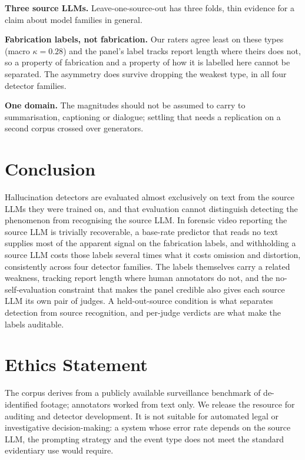 \documentclass{article}
\begin{document}
\textbf{Three source LLMs.} Leave-one-source-out has three folds, thin
evidence for a claim about model families in general.

\textbf{Fabrication labels, not fabrication.} Our raters agree least on these
types (macro $\kappa = 0.28$) and the panel's label tracks report length where
theirs does not, so a property of fabrication and a property of how it is
labelled here cannot be separated. The asymmetry does survive dropping the
weakest type, in all four detector families.

\textbf{One domain.} The magnitudes should not be assumed to carry to
summarisation, captioning or dialogue; settling that needs a replication on a
second corpus crossed over generators.

\section{Conclusion}

Hallucination detectors are evaluated almost exclusively on text from the
source LLMs they were trained on, and that evaluation cannot distinguish
detecting the phenomenon from recognising the source LLM. In forensic video
reporting the source LLM is trivially recoverable, a base-rate predictor that
reads
no text supplies most of the apparent signal on the fabrication labels, and
withholding a source LLM costs those labels several times what it costs
omission and distortion, consistently across four detector families. The
labels themselves carry a related weakness, tracking report length where human
annotators do not, and the no-self-evaluation constraint that makes the panel
credible also gives each source LLM its own pair of judges. A
held-out-source condition is what separates detection from source recognition,
and per-judge
verdicts are what make the labels auditable.

\section*{Ethics Statement}

The corpus derives from a publicly available surveillance benchmark of
de-identified footage; annotators worked from text only. We release the
resource for auditing and detector development. It is not suitable for
automated legal or investigative decision-making: a system whose error rate
depends on the source LLM, the prompting strategy and the event type does not
meet the standard evidentiary use would require.
\end{document}
